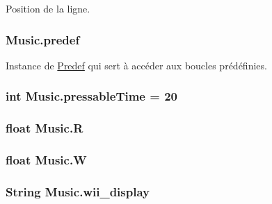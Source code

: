 Position de la ligne. 

\hypertarget{class_music_a23d19ec4b266573443920e3dacc9bd93}{}
\subsubsection[{predef}]{ Music.\+predef\hspace{0.3cm}{\ttfamily [private]}}\label{class_music_a23d19ec4b266573443920e3dacc9bd93}


Instance de \hyperlink{class_predef}{Predef} qui sert à accéder aux boucles prédéfinies. 

\hypertarget{class_music_a2c0e87848bf12c5f29e62f22556f0bb0}{}
\subsubsection[{pressable\+Time}]{\setlength{\rightskip}{0pt plus 5cm}int Music.\+pressable\+Time = 20}\label{class_music_a2c0e87848bf12c5f29e62f22556f0bb0}
\hypertarget{class_music_a2008a64ad37c7a232a8c206d7acdbd0f}{}
\subsubsection[{R}]{\setlength{\rightskip}{0pt plus 5cm}float Music.\+R\hspace{0.3cm}{\ttfamily [private]}}\label{class_music_a2008a64ad37c7a232a8c206d7acdbd0f}
\hypertarget{class_music_acd36d67bfd91798211295d45ef911c34}{}
\subsubsection[{W}]{\setlength{\rightskip}{0pt plus 5cm}float Music.\+W\hspace{0.3cm}{\ttfamily [private]}}\label{class_music_acd36d67bfd91798211295d45ef911c34}
\hypertarget{class_music_a937e074ddcaba7ed3666cf872c94d97f}{}
\subsubsection[{wii\+\_\+display}]{\setlength{\rightskip}{0pt plus 5cm}String Music.\+wii\+\_\+display\hspace{0.3cm}{\ttfamily [private]}}\label{class_music_a937e074ddcaba7ed3666cf872c94d97f}
\hypertarget{class_music_acb9bb6d52e75b11d305be2a2ae180cb5}{}
